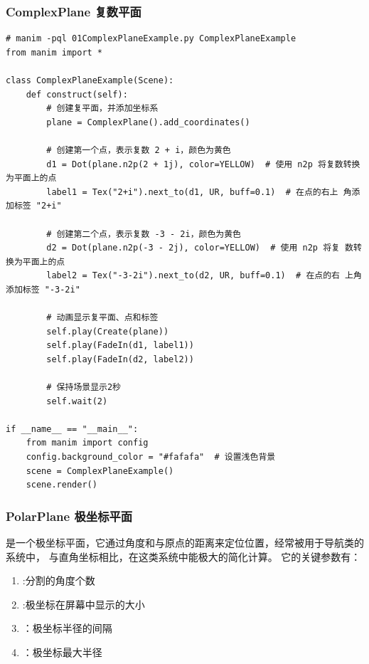 \subsubsection{ComplexPlane 复数平面}
\label{subsubsec:Manim基本图形-复数平面}

\begin{lstlisting}[style=pythonstyle]
# manim -pql 01ComplexPlaneExample.py ComplexPlaneExample
from manim import *

class ComplexPlaneExample(Scene):
    def construct(self):
        # 创建复平面，并添加坐标系
        plane = ComplexPlane().add_coordinates()

        # 创建第一个点，表示复数 2 + i，颜色为黄色
        d1 = Dot(plane.n2p(2 + 1j), color=YELLOW)  # 使用 n2p 将复数转换为平面上的点
        label1 = Tex("2+i").next_to(d1, UR, buff=0.1)  # 在点的右上 角添加标签 "2+i"

        # 创建第二个点，表示复数 -3 - 2i，颜色为黄色
        d2 = Dot(plane.n2p(-3 - 2j), color=YELLOW)  # 使用 n2p 将复 数转换为平面上的点
        label2 = Tex("-3-2i").next_to(d2, UR, buff=0.1)  # 在点的右 上角添加标签 "-3-2i"

        # 动画显示复平面、点和标签
        self.play(Create(plane))
        self.play(FadeIn(d1, label1))
        self.play(FadeIn(d2, label2))

        # 保持场景显示2秒
        self.wait(2)

if __name__ == "__main__":
    from manim import config
    config.background_color = "#fafafa"  # 设置浅色背景
    scene = ComplexPlaneExample()
    scene.render()
\end{lstlisting}        

\subsubsection{PolarPlane 极坐标平面}
\label{subsubsec:Manim基本图形-极坐标平面}
是一个极坐标平面，它通过角度和与原点的距离来定位位置，经常被用于导航类的系统中， 与直角坐标相比，在这类系统中能极大的简化计算。 它的关键参数有：
\begin{enumerate}[label=\arabic*)]
    \item {}:分割的角度个数
    \item {}:极坐标在屏幕中显示的大小
    \item {}：极坐标半径的间隔
    \item {}：极坐标最大半径
\end{enumerate}



